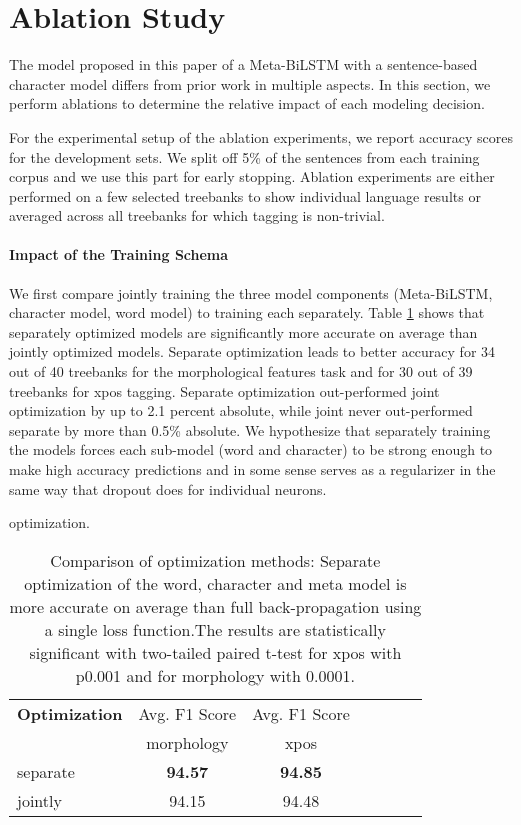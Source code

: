 \documentclass[11pt,a4paper]{article}
\begin{document}
\section{Ablation Study}

The model proposed in this paper of a Meta-BiLSTM with a sentence-based character model differs from prior work in multiple aspects.
In this section, we perform ablations to determine the relative impact of each modeling decision.



For the experimental setup of the ablation experiments, we report accuracy scores for the development sets. We split off 5\% of the sentences from each training corpus and we use this part for early stopping. Ablation experiments are either performed on a few selected treebanks to show individual language results or averaged across all treebanks for which tagging is non-trivial.


\paragraph{Impact of the Training Schema}
We first compare jointly training the three model components (Meta-BiLSTM, character model, word model)  to training each separately.
Table \ref{tab:ablation-opt-sep-full} shows that separately optimized models are significantly more accurate on average than jointly optimized models. 
Separate optimization leads to better accuracy for 34 out of 40 treebanks for the morphological features task and for 30 out of 39 treebanks for xpos tagging. Separate optimization out-performed joint optimization by up to 2.1 percent absolute, while joint never out-performed separate by more than 0.5\% absolute.
We hypothesize that separately training the models forces each sub-model (word and character) to be strong enough to make high accuracy predictions and in some sense serves as a regularizer in the same way that dropout does for individual neurons.

 optimization.
\begin{table}[ht!]
\begin{center}
\small
\setlength{\tabcolsep}{3.5pt}
\begin{tabular}{|l|c|c|c|c|c|c}
\hline 
 \bf Optimization   & Avg. F1 Score   & Avg. F1 Score \\ 
                    &  morphology &  xpos \\ \hline
separate  & \bf 94.57 &  \bf 94.85   \\
jointly   &     94.15  &  94.48    \\
 \hline
\end{tabular}
\end{center}
\caption{Comparison of optimization methods: Separate optimization of the word, character and meta model is more accurate on average than full back-propagation using a single loss function.The results are statistically significant with two-tailed paired t-test for xpos with p0.001 and for morphology with 0.0001.}
\label{tab:ablation-opt-sep-full}
\end{table}
\end{document}
